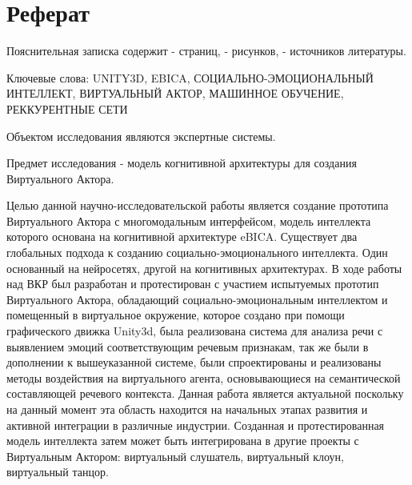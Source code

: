 \chapter*{Реферат}
\thispagestyle{plain}


Пояснительная записка содержит - страниц, - рисунков, -  источников литературы.

Ключевые слова: UNITY3D, EBICA, СОЦИАЛЬНО-ЭМОЦИОНАЛЬНЫЙ ИНТЕЛЛЕКТ, ВИРТУАЛЬНЫЙ АКТОР, МАШИННОЕ ОБУЧЕНИЕ, РЕККУРЕНТНЫЕ СЕТИ 

Объектом исследования являются экспертные системы.

Предмет исследования - модель когнитивной архитектуры для создания Виртуального Актора.

Целью данной научно-исследовательской работы является создание прототипа Виртуального Актора с многомодальным интерфейсом, 
модель интеллекта которого основана на когнитивной архитектуре eBICA.
Существует два глобальных подхода к созданию социально-эмоционального интеллекта. 
Один основанный на нейросетях, другой на когнитивных архитектурах.
В ходе работы над ВКР был разработан и протестирован с участием испытуемых прототип Виртуального Актора, 
обладающий социально-эмоциональным интеллектом и помещенный в виртуальное окружение, которое создано при помощи графического движка Unity3d, 
была реализована система для анализа речи с выявлением эмоций соответствующим речевым признакам, так же были
в дополнении к вышеуказанной системе, были спроектированы и реализованы методы 
воздействия на виртуального агента, основывающиеся на семантической составляющей речевого контекста.
Данная работа является актуальной поскольку на данный момент эта область находится на начальных этапах 
развития и активной интеграции в различные индустрии.
Созданная и протестированная модель интеллекта затем может быть интегрирована в другие проекты с 
Виртуальным Актором: виртуальный слушатель, виртуальный клоун, виртуальный танцор. 
